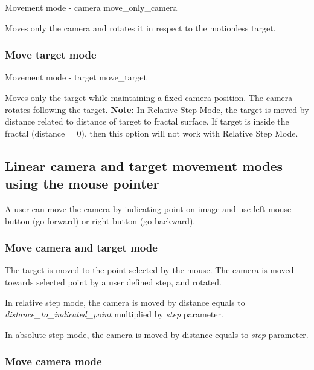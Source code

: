 {Movement mode - camera}
{move_only_camera}

Moves only the camera and rotates it in respect to the motionless target.

\subsubsection{Move target mode}\label{move-target-mode}

{Movement mode - target}
{move_target}

Moves only the target while maintaining a fixed camera position. The camera
rotates following the target. \textbf{Note:} In Relative Step Mode, the target
is moved by distance related to distance of target to fractal surface. If target
is inside the fractal (distance = 0), then this option will not work with
Relative Step Mode.

\subsection{Linear camera and target movement modes using the mouse
	pointer}\label{linear-camera-and-target-movement-modes-using-the-mouse-pointer}

A user can move the camera by indicating point on image and use left mouse
button (go forward) or right button (go backward).


\subsubsection{Move camera and target mode}\label{move-camera-and-target-mode-1}

The target is moved to the point selected by the mouse. The camera is moved
towards selected point by a user defined step, and rotated.

In relative step mode, the camera is moved by distance equals to
\emph{distance\_to\_indicated\_point} multiplied by \emph{step} parameter.

In absolute step mode, the camera is moved by distance equals to \emph{step}
parameter.

\subsubsection{Move camera mode}\label{move-camera-mode-1}

